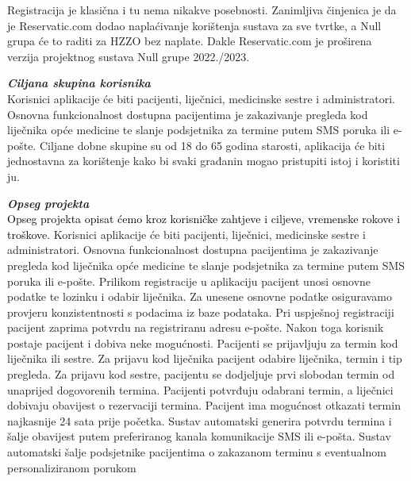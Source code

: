   
              
              \texttt{}{Registracija je klasična i tu nema nikakve posebnosti. Zanimljiva činjenica je da je Reservatic.com dodao naplaćivanje korištenja sustava za sve tvrtke, a Null grupa će to raditi za HZZO bez naplate. Dakle Reservatic.com je proširena verzija projektnog sustava Null grupe 2022./2023.}
              \newline
            
		       \textbf{\textit{Ciljana skupina korisnika}}\\

         
  
            \texttt{}{
            Korisnici aplikacije će biti pacijenti, liječnici, medicinske sestre i administratori. Osnovna funkcionalnost dostupna pacijentima je zakazivanje pregleda kod 
liječnika opće medicine te slanje podsjetnika za termine putem SMS poruka ili 
e-pošte. Ciljane dobne skupine su od 18 do 65 godina starosti, aplikacija će biti jednostavna za korištenje kako bi svaki građanin mogao pristupiti istoj i koristiti ju.  }	

\textbf{\textit{Opseg projekta}}\\
  
            \textcolor{black}{Opseg projekta opisat ćemo kroz korisničke zahtjeve i ciljeve, vremenske rokove i troškove. 
            }
            \texttt{}{Korisnici aplikacije će biti pacijenti, liječnici, medicinske sestre i administratori. Osnovna funkcionalnost dostupna pacijentima je zakazivanje pregleda kod liječnika opće medicine te slanje podsjetnika za termine putem SMS poruka ili e-pošte.}
            \texttt{}{ Prilikom registracije u aplikaciju pacijent unosi osnovne podatke te lozinku i odabir liječnika. Za unesene osnovne podatke osiguravamo provjeru konzistentnosti s podacima iz baze podataka. Pri uspješnoj registraciji pacijent zaprima potvrdu na registriranu adresu e-pošte. Nakon toga korisnik postaje pacijent i dobiva neke mogućnosti. Pacijenti se prijavljuju za termin kod liječnika ili sestre. Za prijavu kod liječnika
pacijent odabire liječnika, termin i tip pregleda. Za prijavu kod sestre, pacijentu se dodjeljuje prvi slobodan termin od unaprijed dogovorenih termina. Pacijenti potvrđuju odabrani termin, a liječnici dobivaju obavijest o rezervaciji termina. Pacijent ima mogućnost otkazati termin najkasnije 24 sata prije početka.
Sustav automatski generira potvrdu termina i šalje obavijest putem 
preferiranog kanala komunikacije SMS ili e-pošta. Sustav automatski šalje 
podsjetnike pacijentima o zakazanom terminu s eventualnom 
personaliziranom porukom}
\newline


